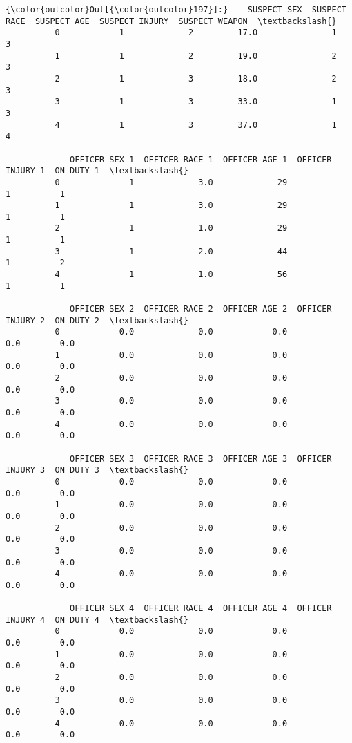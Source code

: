 \documentclass[11pt]{article}
\begin{document}
\begin{Verbatim}[commandchars=\\\{\}]
{\color{outcolor}Out[{\color{outcolor}197}]:}    SUSPECT SEX  SUSPECT RACE  SUSPECT AGE  SUSPECT INJURY  SUSPECT WEAPON  \textbackslash{}
          0            1             2         17.0               1               3   
          1            1             2         19.0               2               3   
          2            1             3         18.0               2               3   
          3            1             3         33.0               1               3   
          4            1             3         37.0               1               4   
          
             OFFICER SEX 1  OFFICER RACE 1  OFFICER AGE 1  OFFICER INJURY 1  ON DUTY 1  \textbackslash{}
          0              1             3.0             29                 1          1   
          1              1             3.0             29                 1          1   
          2              1             1.0             29                 1          1   
          3              1             2.0             44                 1          2   
          4              1             1.0             56                 1          1   
          
             OFFICER SEX 2  OFFICER RACE 2  OFFICER AGE 2  OFFICER INJURY 2  ON DUTY 2  \textbackslash{}
          0            0.0             0.0            0.0               0.0        0.0   
          1            0.0             0.0            0.0               0.0        0.0   
          2            0.0             0.0            0.0               0.0        0.0   
          3            0.0             0.0            0.0               0.0        0.0   
          4            0.0             0.0            0.0               0.0        0.0   
          
             OFFICER SEX 3  OFFICER RACE 3  OFFICER AGE 3  OFFICER INJURY 3  ON DUTY 3  \textbackslash{}
          0            0.0             0.0            0.0               0.0        0.0   
          1            0.0             0.0            0.0               0.0        0.0   
          2            0.0             0.0            0.0               0.0        0.0   
          3            0.0             0.0            0.0               0.0        0.0   
          4            0.0             0.0            0.0               0.0        0.0   
          
             OFFICER SEX 4  OFFICER RACE 4  OFFICER AGE 4  OFFICER INJURY 4  ON DUTY 4  \textbackslash{}
          0            0.0             0.0            0.0               0.0        0.0   
          1            0.0             0.0            0.0               0.0        0.0   
          2            0.0             0.0            0.0               0.0        0.0   
          3            0.0             0.0            0.0               0.0        0.0   
          4            0.0             0.0            0.0               0.0        0.0   
          

\end{Verbatim}
\end{document}
